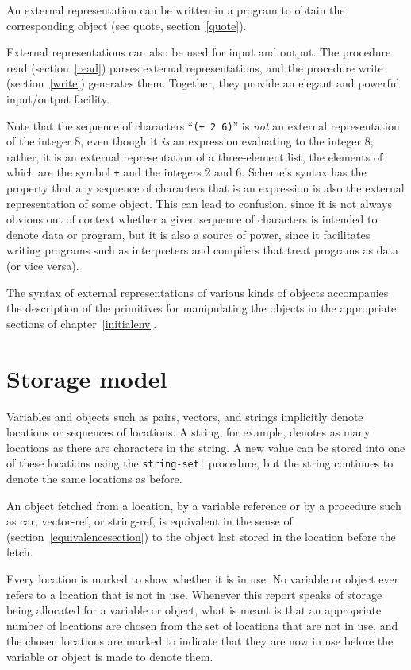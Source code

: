 An external representation can be written in a program to obtain the
corresponding object (see {\cf quote}, section~\ref{quote}).

External representations can also be used for input and output.  The
procedure {\cf read} (section~\ref{read}) parses external
representations, and the procedure {\cf write} (section~\ref{write})
generates them.  Together, they provide an elegant and powerful
input/output facility.

Note that the sequence of characters ``{\tt(+ 2 6)}'' is {\em not} an
external representation of the integer 8, even though it {\em is} an
expression evaluating to the integer 8; rather, it is an external
representation of a three-element list, the elements of which are the symbol
{\tt +} and the integers 2 and 6.  Scheme's syntax has the property that
any sequence of characters that is an expression is also the external
representation of some object.  This can lead to confusion, since it is not always
obvious out of context whether a given sequence of characters is
intended to denote data or program, but it is also a source of power,
since it facilitates writing programs such as interpreters and
compilers that treat programs as data (or vice versa).

The syntax of external representations of various kinds of objects
accompanies the description of the primitives for manipulating the
objects in the appropriate sections of chapter~\ref{initialenv}.

\section{Storage model}
\label{storagemodel}

Variables and objects such as pairs, vectors, and strings implicitly
denote locations or sequences of locations.  A string, for
example, denotes as many locations as there are characters in the string. 
A new value can be
stored into one of these locations using the {\tt string-set!} procedure, but
the string continues to denote the same locations as before.

An object fetched from a location, by a variable reference or by
a procedure such as {\cf car}, {\cf vector-ref}, or {\cf string-ref}, is
equivalent in the sense of  %
(section~\ref{equivalencesection})
to the object last stored in the location before the fetch.

Every location is marked to show whether it is in use.
No variable or object ever refers to a location that is not in use.
Whenever this report speaks of storage being allocated for a variable
or object, what is meant is that an appropriate number of locations are
chosen from the set of locations that are not in use, and the chosen
locations are marked to indicate that they are now in use before the variable
or object is made to denote them.

